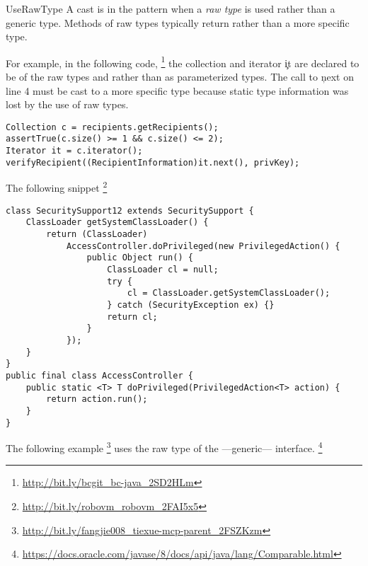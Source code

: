 \begin{pattern}{UseRawType}
A cast is in the \thisp{} pattern when a \emph{raw type} is used rather than a generic type.
Methods of raw types typically return  rather than a more specific type.

\instances{}
For example, in the following code,%
\footnote{\url{http://bit.ly/bcgit_bc-java_2SD2HLm}}
the collection  and iterator \c{it} are declared to be of the raw types  and  rather than as parameterized types.
The call to \c{next} on line 4 must be cast to a more specific type because static type information was lost by the use of raw types.

\begin{verbatim}
Collection c = recipients.getRecipients();
assertTrue(c.size() >= 1 && c.size() <= 2);
Iterator it = c.iterator();
verifyRecipient((RecipientInformation)it.next(), privKey);
\end{verbatim}

The following snippet%
\footnote{\url{http://bit.ly/robovm_robovm_2FAI5x5}}

\begin{verbatim}
class SecuritySupport12 extends SecuritySupport {
    ClassLoader getSystemClassLoader() {
        return (ClassLoader)
            AccessController.doPrivileged(new PrivilegedAction() {
                public Object run() {
                    ClassLoader cl = null;
                    try {
                        cl = ClassLoader.getSystemClassLoader();
                    } catch (SecurityException ex) {}
                    return cl;
                }
            });
    }
}
public final class AccessController {
    public static <T> T doPrivileged(PrivilegedAction<T> action) {
        return action.run();
    }
}
\end{verbatim}

The following example%
\footnote{\url{http://bit.ly/fangjie008_tiexue-mcp-parent_2FSZKzm}}
uses the raw type of the  ---generic--- interface.%
\footnote{\url{https://docs.oracle.com/javase/8/docs/api/java/lang/Comparable.html}}


\end{pattern}
